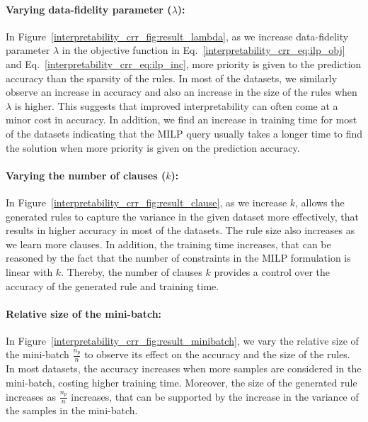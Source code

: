 	\paragraph{Varying data-fidelity parameter ($ \lambda $):} In Figure~\ref{interpretability_crr_fig:result_lambda}, as we increase data-fidelity parameter $ \lambda $ in the objective function in Eq.~\ref{interpretability_crr_eq:ilp_obj} and Eq.~\ref{interpretability_crr_eq:ilp_inc}, more priority is given to the prediction accuracy than the sparsity of the rules.  In most of the datasets, we similarly observe an increase in accuracy  and also an increase in the size of the rules when $ \lambda $ is higher. This suggests that improved interpretability can often come at a  minor cost in accuracy.  In addition, we  find an increase in training time for most of the datasets indicating that the MILP query usually takes a longer time to find the solution when more priority is given on the prediction accuracy.  
	

	
	\paragraph{Varying the number of clauses ($ k $): }
	In Figure~\ref{interpretability_crr_fig:result_clause}, as we increase  $ k $, {\crr} allows the generated rules to capture the variance in the given dataset more effectively, that results in higher  accuracy in most of the datasets. The  rule size also increases as we learn more clauses. In addition, the training time  increases, that can be reasoned by the fact that the number of constraints in the MILP formulation is linear with $ k $. Thereby, the number of clauses $ k $ provides a control over the accuracy of the generated rule and training time. 
	 
	 
	 
	\paragraph{Relative size of the mini-batch:} In Figure~\ref{interpretability_crr_fig:result_minibatch}, we vary the relative size of the mini-batch $ \frac{n_p}{n} $ to observe its effect on the accuracy and the size of the rules. In most datasets,  the accuracy increases when more samples are considered in the mini-batch, costing higher   training time.  Moreover, the size of the generated rule increases as $ \frac{n_p}{n} $ increases, that can be supported by the increase  in the variance of the samples in the mini-batch.
	
